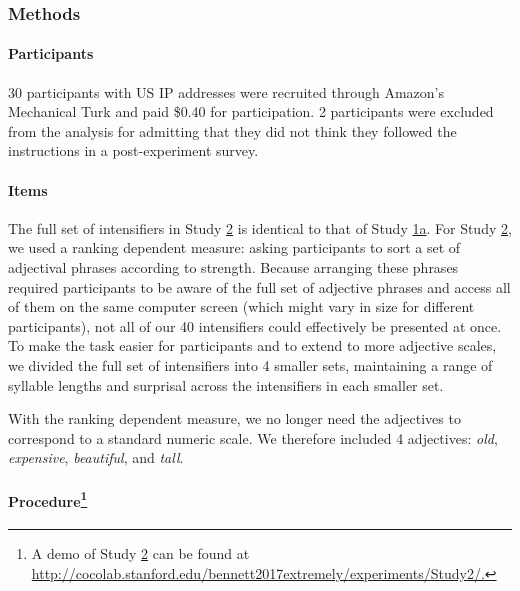 \documentclass[10pt,letterpaper]{article}
\newcommand{\w}[1]{\emph{#1}}
\begin{document}
\subsubsection{Methods}

\paragraph{Participants}

30 participants with US IP addresses were recruited through Amazon's Mechanical Turk and paid \$0.40 for  participation. 2 participants were excluded from the analysis for admitting that they did not think they followed the instructions in a post-experiment survey.

\paragraph{Items}

The full set of intensifiers in Study \hyperref[sec:study2]{2} is identical to that of Study \hyperref[sec:study1a]{1a}. 
For Study \hyperref[sec:study2]{2}, we used a ranking dependent measure: asking participants to sort a set of adjectival phrases according to strength.
Because arranging these phrases required participants to be aware of the full set of adjective phrases and access all of them on the same computer screen (which might vary in size for different participants), not all of our 40 intensifiers could effectively be presented at once.
To make the task easier for participants and to extend to more adjective scales, we divided the full set of intensifiers into 4 smaller sets, maintaining a range of syllable lengths and surprisal across the intensifiers in each smaller set.

With the ranking dependent measure, we no longer need the adjectives to correspond to a standard numeric scale.
We therefore included 4 adjectives: \w{old}, \w{expensive}, \w{beautiful}, and \w{tall}.

\paragraph{Procedure\footnote{A demo of Study \hyperref[sec:study2]{2} can be found at \url{http://cocolab.stanford.edu/bennett2017extremely/experiments/Study2/.}}}
\end{document}
